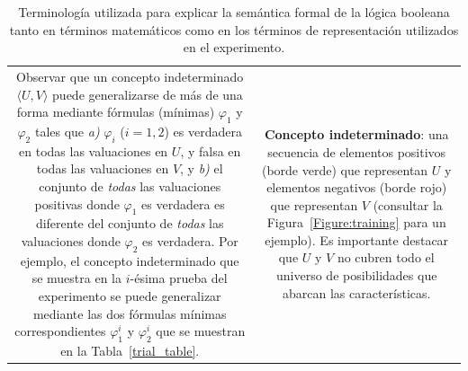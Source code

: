 \begin{table}[]
\begin{tabular}{c|c}
\begin{minipage}[t]{0.45\textwidth}
Observar que un concepto indeterminado $ \langle U, V \rangle $ puede generalizarse de más de una forma mediante fórmulas (mínimas) $ \varphi_1 $ y $ \varphi_2 $ tales que {\em a)} $ \varphi_i $ ($ i = 1,2 $) es verdadera en todas las valuaciones en $ U $, y falsa en todas las valuaciones en $ V $, y {\em b)} el conjunto de {\em todas} las valuaciones positivas donde $ \varphi_1 $ es verdadera es diferente del conjunto de {\em todas} las valuaciones donde $ \varphi_2 $ es verdadera. Por ejemplo, el concepto indeterminado que se muestra en la $ i $-ésima prueba del experimento se puede generalizar mediante las dos fórmulas mínimas correspondientes $ \varphi^i_1 $ y $ \varphi^i_2 $ que se muestran en la Tabla~\ref{trial_table}.
\end{minipage}
&
\begin{minipage}[t]{0.45\textwidth}
{\bf Concepto indeterminado}: una secuencia de elementos positivos (borde verde) que representan $ U $ y elementos negativos (borde rojo) que representan $ V $ (consultar la Figura~\ref{Figure:training} para un ejemplo). Es importante destacar que $ U $ y $ V $ no cubren todo el universo de posibilidades que abarcan las características.\end{minipage}
\end{tabular}
\caption {Terminología utilizada para explicar la semántica formal de la lógica booleana tanto en términos matemáticos como en los términos de representación utilizados en el experimento.}
\label{tab:glosario}
\end{table}







